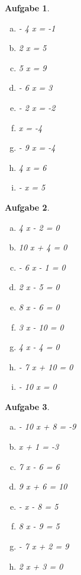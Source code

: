 \documentclass[12pt,fleqn]{article}
\theoremstyle{aufg}
\newtheorem{aufgabe}{Aufgabe}
\theoremstyle{bsp}
\begin{document}
 
    \begin{flushleft}
\begin{aufgabe} ~ \\ 
\begin{multicols}{3} 
\begin{enumerate}[a)] 
\item 
- 4 x = -1
\item 
2 x = 5
\item 
5 x = 9
\item 
- 6 x = 3
\item 
- 2 x = -2
\item 
x = -4
\item 
- 9 x = -4
\item 
4 x = 6
\item 
- x = 5
\end{enumerate} 
\end{multicols} 
\end{aufgabe} 
\begin{aufgabe} ~ \\ 
\begin{multicols}{3} 
\begin{enumerate}[a)] 
\item 
4 x - 2 = 0
\item 
10 x + 4 = 0
\item 
- 6 x - 1 = 0
\item 
2 x - 5 = 0
\item 
8 x - 6 = 0
\item 
3 x - 10 = 0
\item 
4 x - 4 = 0
\item 
- 7 x + 10 = 0
\item 
- 10 x = 0
\end{enumerate} 
\end{multicols} 
\end{aufgabe} 
\begin{aufgabe} ~ \\ 
\begin{multicols}{3} 
\begin{enumerate}[a)] 
\item 
- 10 x + 8 = -9
\item 
x + 1 = -3
\item 
7 x - 6 = 6
\item 
9 x + 6 = 10
\item 
- x - 8 = 5
\item 
8 x - 9 = 5
\item 
- 7 x + 2 = 9
\item 
2 x + 3 = 0

\end{enumerate}
\end{multicols}
\end{aufgabe}
\end{flushleft}
\end{document}
